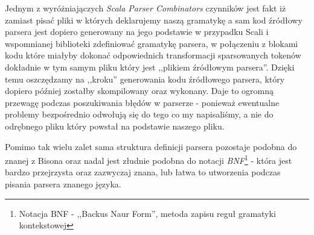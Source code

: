 \documentclass[pdflatex,11pt]{aghdpl}
\begin{document}




Jednym z wyróżniajączych \textit{Scala Parser Combinators} czynników jest fakt iż zamiast pisać pliki w których deklarujemy naszą gramatykę a 
sam kod źródłowy parsera jest dopiero generowany na jego podstawie w przypadku Scali i wspomnianej biblioteki zdefiniować gramatykę parsera, 
w połączeniu z blokami kodu które miałyby dokonać odpowiednich transformacji sparsowanych tokenów dokładnie w tym samym pliku który jest ,,plikiem źródłowym parsera''.
Dzięki temu oszczędzamy na ,,kroku'' generowania kodu źródłowego parsera, który dopiero później zostałby skompilowany oraz wykonany. 
Daje to ogromną przewagę podczas poszukiwania błędów w parserze - ponieważ ewentualne problemy bezpośrednio odwołują się do tego co my napisaliśmy,
a nie do odrębnego pliku który powstał na podstawie naszego pliku.

Pomimo tak wielu zalet sama struktura definicji parsera pozostaje podobna do znanej z Bisona oraz nadal jest złudnie 
podobna do notacji \textit{BNF}\footnote{Notacja BNF - ,,Backus Naur Form'', metoda zapisu reguł gramatyki kontekstowej} 
- która jest bardzo przejrzysta oraz zazwyczaj znana, lub łatwa to utworzenia podczas pisania parsera znanego języka.
\end{document}

